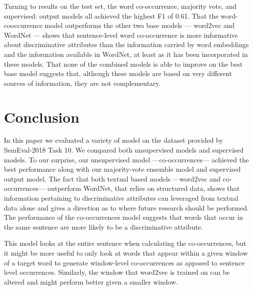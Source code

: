 \documentclass[11pt,a4paper]{article}
\begin{document}
Turning to results on the test set, the word co-occurrence, majority
vote, and supervised: output models all achieved the highest F1 of
0.61. That the word-cooccurrence model outperforms the other two base
models --- word2vec and WordNet --- shows that sentence-level word
co-occurrence is more informative about discriminative attributes than
the information carried by word embeddings and the information
available in WordNet, at least as it has been incorporated in these
models. That none of the combined models is able to improve on the
best base model suggests that, although these models are based on very
different sources of information, they are not complementary.

\section{Conclusion}




In this paper we evaluated a variety of model on the dataset provided
by SemEval-2018 Task 10. We compared both unsupervised models and
supervised models. To our surprise, our unsupervised model
---co-occurrences--- achieved the best performance along with our
majority-vote ensemble model and supervised output model. The fact
that both textual based models ---word2vec and co-occurrences---
outperform WordNet, that relies on structured data, shows that
information pertaining to discriminative attributes can leveraged from
textual data alone and gives a direction as to where future research
should be performed. The performance of the co-occurrences model
suggests that words that occur in the same sentence are more likely to
be a discriminative attribute. 


This model looks at the entire sentence when calculating the
co-occurrences, but it might be more useful to only look at words that
appear within a given window of a target word to generate window-level
co-occurrences as apposed to sentence level occurrences. Similarly,
the window that word2vec is trained on can be altered and might
perform better given a smaller window.




\end{document}
